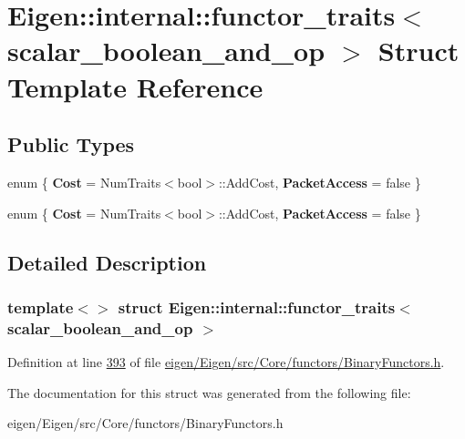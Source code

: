 \hypertarget{struct_eigen_1_1internal_1_1functor__traits_3_01scalar__boolean__and__op_01_4}{}\section{Eigen\+:\+:internal\+:\+:functor\+\_\+traits$<$ scalar\+\_\+boolean\+\_\+and\+\_\+op $>$ Struct Template Reference}
\label{struct_eigen_1_1internal_1_1functor__traits_3_01scalar__boolean__and__op_01_4}
\subsection*{Public Types}
\begin{DoxyCompactItemize}
\item 
\mbox{\label{struct_eigen_1_1internal_1_1functor__traits_3_01scalar__boolean__and__op_01_4_a84b98a3ad0445b89a15e981890c936f0}} 
enum \{ {\bfseries Cost} = Num\+Traits$<$bool$>$\+:\+:Add\+Cost, 
{\bfseries Packet\+Access} = false
 \}
\item 
\mbox{\label{struct_eigen_1_1internal_1_1functor__traits_3_01scalar__boolean__and__op_01_4_a64c2299781d42a178bd5ec5648490bf1}} 
enum \{ {\bfseries Cost} = Num\+Traits$<$bool$>$\+:\+:Add\+Cost, 
{\bfseries Packet\+Access} = false
 \}
\end{DoxyCompactItemize}


\subsection{Detailed Description}
\subsubsection*{template$<$$>$\newline
struct Eigen\+::internal\+::functor\+\_\+traits$<$ scalar\+\_\+boolean\+\_\+and\+\_\+op $>$}



Definition at line \hyperlink{eigen_2_eigen_2src_2_core_2functors_2_binary_functors_8h_source_l00393}{393} of file \hyperlink{eigen_2_eigen_2src_2_core_2functors_2_binary_functors_8h_source}{eigen/\+Eigen/src/\+Core/functors/\+Binary\+Functors.\+h}.



The documentation for this struct was generated from the following file\+:\begin{DoxyCompactItemize}
\item 
eigen/\+Eigen/src/\+Core/functors/\+Binary\+Functors.\+h\end{DoxyCompactItemize}
